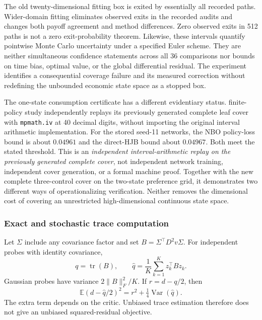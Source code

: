 \documentclass[ecta,nameyear,draft]{econsocart}
\theoremstyle{definition}
\theoremstyle{remark}
\newcommand{\E}{\mathbb E}
\newcommand{\tr}{\operatorname{tr}}
\begin{document}
The old twenty-dimensional fitting box is exited by essentially all recorded paths. Wider-domain fitting eliminates observed exits in the recorded audits and changes both payoff agreement and method differences. Zero observed exits in 512 paths is not a zero exit-probability theorem. Likewise, these intervals quantify pointwise Monte Carlo uncertainty under a specified Euler scheme. They are neither simultaneous confidence statements across all 36 comparisons nor bounds on time bias, optimal value, or the global differential residual. The experiment identifies a consequential coverage failure and its measured correction without redefining the unbounded economic state space as a stopped box.

The one-state consumption certificate has a different evidentiary status. finite-policy study independently replays its previously generated complete leaf cover with \texttt{mpmath.iv} at 40 decimal digits, without importing the original interval arithmetic implementation. For the stored seed-11 networks, the NBO policy-loss bound is about $0.04961$ and the direct-HJB bound about $0.04967$. Both meet the stated threshold. This is an \emph{independent interval-arithmetic replay on the previously generated complete cover}, not independent network training, independent cover generation, or a formal machine proof. Together with the new complete three-control cover on the two-state preference grid, it demonstrates two different ways of operationalizing verification. Neither removes the dimensional cost of covering an unrestricted high-dimensional continuous state space.



\subsubsection{Exact and stochastic trace computation}
Let $\Sigma$ include any covariance factor and set $B=\Sigma^\top D^2v\Sigma$. For independent probes with identity covariance,
\begin{equation}\label{eq:trace}
 q=\tr(B),\qquad \widehat q=\frac1K\sum_{k=1}^Kz_k^\top Bz_k.
\end{equation}
Gaussian probes have variance $2\|B\|_F^2/K$. If $r=d-q/2$, then
\begin{equation}\label{eq:tracebias}
 \E(d-\widehat q/2)^2=r^2+\tfrac14\operatorname{Var}(\widehat q).
\end{equation}
The extra term depends on the critic. Unbiased trace estimation therefore does not give an unbiased squared-residual objective.
\end{document}
